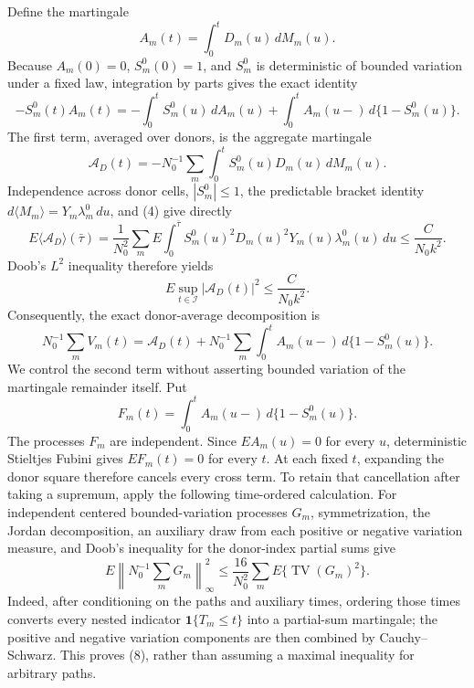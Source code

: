 Define the martingale
\[
 A_m(t)=\int_0^tD_m(u)\,dM_m(u).
\]
Because \(A_m(0)=0\), \(S_m^0(0)=1\), and \(S_m^0\) is deterministic
of bounded variation under a fixed law, integration by parts gives the exact
identity
\[
 -S_m^0(t)A_m(t)
 =-\int_0^tS_m^0(u)\,dA_m(u)
  +\int_0^tA_m(u-)\,d\{1-S_m^0(u)\}.
\]
The first term, averaged over donors, is the aggregate martingale
\[
 \mathcal A_D(t)
 =-N_0^{-1}\sum_m\int_0^tS_m^0(u)D_m(u)\,dM_m(u).
\]
Independence across donor cells, \(|S_m^0|\leq1\), the predictable bracket
identity \(d\langle M_m\rangle=Y_m\lambda_m^0\,du\), and (4) give directly
\[
 E\langle\mathcal A_D\rangle(\bar\tau)
 =\frac{1}{N_0^2}\sum_m E\int_0^{\bar\tau}
   S_m^0(u)^2D_m(u)^2Y_m(u)\lambda_m^0(u)\,du
 \leq\frac{C}{N_0k^2}.
\]
Doob's \(L^2\) inequality therefore yields
\[
 E\sup_{t\in\mathcal I}|\mathcal A_D(t)|^2
 \leq \frac{C}{N_0k^2}.                                 \tag{6}
\]
Consequently, the exact donor-average decomposition is
\[
 N_0^{-1}\sum_mV_m(t)
 =\mathcal A_D(t)
  +N_0^{-1}\sum_m\int_0^tA_m(u-)\,d\{1-S_m^0(u)\}.     \tag{7}
\]
We control the second term without asserting bounded variation of the
martingale remainder itself.  Put
\[
 F_m(t)=\int_0^tA_m(u-)\,d\{1-S_m^0(u)\}.
\]
The processes \(F_m\) are independent.  Since \(EA_m(u)=0\) for every
\(u\), deterministic Stieltjes Fubini gives \(EF_m(t)=0\) for every \(t\).
At each fixed \(t\), expanding the donor square therefore cancels every
cross term.  To retain that cancellation after taking a supremum, apply the
following time-ordered calculation.  For independent centered
bounded-variation processes \(G_m\), symmetrization, the Jordan decomposition,
an auxiliary draw from each positive or negative variation measure, and
Doob's inequality for the donor-index partial sums give
\[
 E\left\|N_0^{-1}\sum_mG_m\right\|_\infty^2
 \leq\frac{16}{N_0^2}\sum_mE\{\operatorname{TV}(G_m)^2\}. \tag{8}
\]
Indeed, after conditioning on the paths and auxiliary times, ordering those
times converts every nested indicator \(\mathbf 1\{T_m\leq t\}\) into a
partial-sum martingale; the positive and negative variation components are
then combined by Cauchy--Schwarz.  This proves (8), rather than assuming a
maximal inequality for arbitrary paths.

